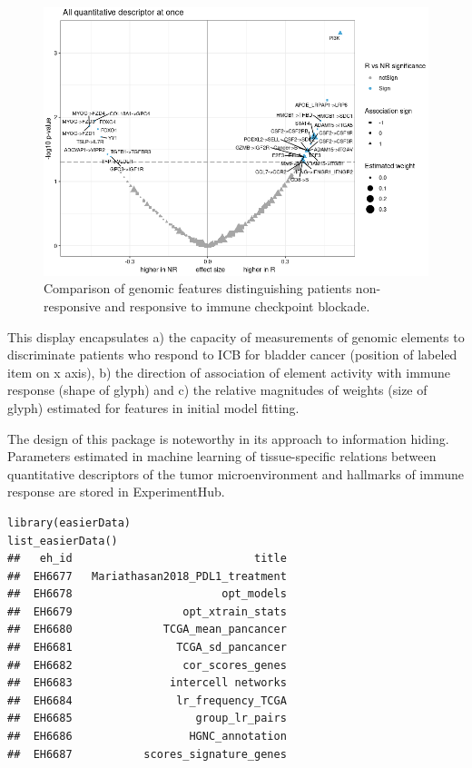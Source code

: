 \documentclass[graybox]{svmult}
\begin{document}
\begin{figure}
\includegraphics[width=0.95\linewidth,]{easierFinal} \caption{Comparison of genomic features distinguishing patients non-responsive and responsive to immune checkpoint blockade.}\label{fig:easfin}
\end{figure}

This display encapsulates a) the capacity of measurements of
genomic elements to discriminate patients who respond
to ICB for bladder cancer (position of labeled
item on x axis), b) the direction of association of
element activity with immune response (shape of glyph) and c) the
relative magnitudes of weights (size of glyph) estimated for features in
initial model fitting.

The design of this package is noteworthy in its approach
to information hiding. Parameters estimated in machine
learning of tissue-specific relations between quantitative
descriptors of the tumor microenvironment and hallmarks
of immune response are stored in ExperimentHub.

\begin{shaded}
\begin{verbatim}
library(easierData)
list_easierData()
##   eh_id                            title
##  EH6677   Mariathasan2018_PDL1_treatment
##  EH6678                       opt_models
##  EH6679                 opt_xtrain_stats
##  EH6680              TCGA_mean_pancancer
##  EH6681                TCGA_sd_pancancer
##  EH6682                 cor_scores_genes
##  EH6683               intercell networks
##  EH6684                lr_frequency_TCGA
##  EH6685                   group_lr_pairs
##  EH6686                  HGNC_annotation
##  EH6687           scores_signature_genes
\end{verbatim}
\end{shaded}
\end{document}
